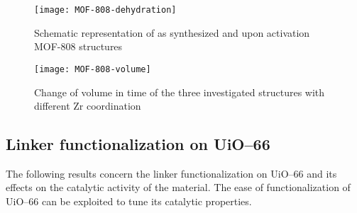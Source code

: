 \begin{figure}[!htbp]
	\centering
	\texttt{[image: MOF-808-dehydration]}
	\caption{Schematic representation of as synthesized and upon activation MOF-808 structures}
	\label{fig:MOF-808-dehydration}
\end{figure}

\begin{figure}[!htbp]
	\centering
	\texttt{[image: MOF-808-volume]}
	\caption{Change of volume in time of the three investigated structures with different Zr coordination}
	\label{fig:MOF-808-volume}
\end{figure}

\subsection*{Linker functionalization on UiO--66}
The following results concern the linker functionalization on UiO--66 and its effects on the catalytic activity of the material. The ease of functionalization of UiO--66 can be exploited to tune its catalytic properties. 

